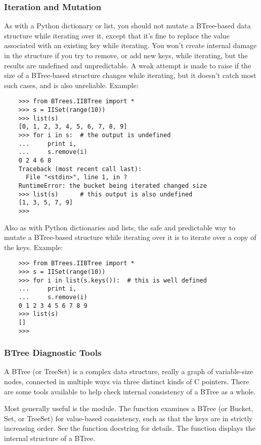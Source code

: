 \subsubsection{Iteration and Mutation}

As with a Python dictionary or list, you should not mutate a BTree-based
data structure while iterating over it, except that it's fine to replace
the value associated with an existing key while iterating.  You won't
create internal damage in the structure if you try to remove, or add new
keys, while iterating, but the results are undefined and unpredictable.  A
weak attempt is made to raise  if the size of a
BTree-based structure changes while iterating, but it doesn't catch most
such cases, and is also unreliable.  Example:

\begin{verbatim}
    >>> from BTrees.IIBTree import *
    >>> s = IISet(range(10))
    >>> list(s)
    [0, 1, 2, 3, 4, 5, 6, 7, 8, 9]
    >>> for i in s:  # the output is undefined
    ...     print i,
    ...     s.remove(i)
    0 2 4 6 8
    Traceback (most recent call last):
      File "<stdin>", line 1, in ?
    RuntimeError: the bucket being iterated changed size
    >>> list(s)      # this output is also undefined
    [1, 3, 5, 7, 9]
    >>>
\end{verbatim}

Also as with Python dictionaries and lists, the safe and predictable way
to mutate a BTree-based structure while iterating over it is to iterate
over a copy of the keys.  Example:

\begin{verbatim}
    >>> from BTrees.IIBTree import *
    >>> s = IISet(range(10))
    >>> for i in list(s.keys()):  # this is well defined
    ...     print i,
    ...     s.remove(i)
    0 1 2 3 4 5 6 7 8 9
    >>> list(s)
    []
    >>>
\end{verbatim}


\subsubsection{BTree Diagnostic Tools}

A BTree (or TreeSet) is a complex data structure, really a graph of
variable-size nodes, connected in multiple ways via three distinct kinds
of C pointers.  There are some tools available to help check internal
consistency of a BTree as a whole.

Most generally useful is the  module.  The
 function examines a BTree (or Bucket, Set, or
TreeSet) for value-based consistency, such as that the keys are in
strictly increasing order.  See the function docstring for details.
The  function displays the internal structure
of a BTree.

